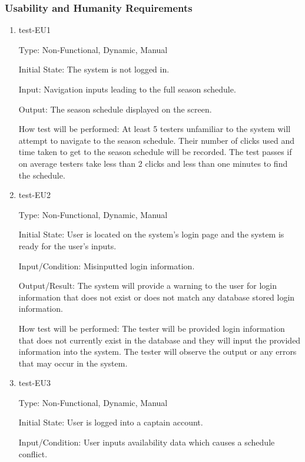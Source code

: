 \documentclass[12pt, titlepage]{article}
\begin{document}
\subsubsection{Usability and Humanity Requirements}

\begin{enumerate}

  \item{test-EU1\\}

  Type: Non-Functional, Dynamic, Manual

  Initial State: The system is not logged in.

  Input: Navigation inputs leading to the full season schedule.

  Output: The season schedule displayed on the screen.

  How test will be performed: At least 5 testers unfamiliar to the system will
  attempt to navigate to the season schedule. Their number of clicks used and
  time taken to get to the season schedule will be recorded. The test passes
  if on average testers take less than 2 clicks and less than one minutes to
  find the schedule.

  \item{test-EU2\\}

  Type: Non-Functional, Dynamic, Manual

  Initial State: User is located on the system's login page and the system is ready
  for the user's inputs.

  Input/Condition: Misinputted login information.

  Output/Result: The system will provide a warning to the user for login information that
  does not exist or does not match any database stored login information.

  How test will be performed: The tester will be provided login information that does not
  currently exist in the database and they will input the provided information into the
  system. The tester will observe the output or any errors that may occur in the system.

  \item{test-EU3\\}
  
  Type: Non-Functional, Dynamic, Manual
            
  Initial State: User is logged into a captain account.
            
  Input/Condition: User inputs availability data which causes a schedule conflict.
            

\end{enumerate}
\end{document}

